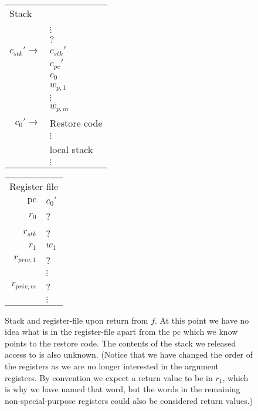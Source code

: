 \documentclass[a4paper]{article}
\newcommand{\var}[1]{\mathit{#1}}
\newcommand{\pc}{\mathit{pc}}
\newcommand{\pcreg}{\mathrm{pc}}
\begin{document}
\begin{figure}
  \label{fig:stack-upon-return}
  \centering
  \begin{tabular}[!h]{r | >{\raggedright\arraybackslash}p{3cm} |}
\multicolumn{2}{l}{Stack} \\
\cline{2-2}
   & \\
   & $\vdots$\\
\cline{2-2} 
   & $?$\\
\cline{2-2} 
$c_{\var{stk}}' \rightarrow$  & $c_{\var{stk}}'$ \\
\cline{2-2}
   & $c_\pc'$ \\
\cline{2-2}
   & $c_0$ \\
\cline{2-2}
   & $w_{p,1}$ \\
\cline{2-2}
   & $\vdots$ \\
\cline{2-2}
   & $w_{p,m}$ \\
\cline{2-2}
$c_0' \rightarrow$   & Restore code \\
   & $\vdots$\\
\cline{2-2}
   & local stack\\
   & $\vdots$\\
\cline{2-2}
\end{tabular}
\hspace{1cm}
\begin{tabular}{r | >{\centering\arraybackslash}p{0.75cm} |}
\multicolumn{2}{r}{Register file} \\
\cline{2-2}
$\pcreg$ & $c_0'$\\
\cline{2-2}
$r_0$  &  ? \\
\cline{2-2}
$r_{\var{stk}}$  & ? \\
\cline{2-2}
$r_1$ & $w_1$ \\
\cline{2-2}
$r_{\var{priv},1}$ & ?\\
\cline{2-2}
& $\vdots$ \\
\cline{2-2}
$r_{\var{priv},m}$ & ? \\
\cline{2-2}
& $\vdots$ \\
\cline{2-2}
\end{tabular}
\caption{ Stack and register-file upon return from $f$. At this point we have no idea what is in the register-file apart from the $\pcreg$ which we know points to the restore code. The contents of the stack we released access to is also unknown. (Notice that we have changed the order of the registers as we are no longer interested in the argument registers. By convention we expect a return value to be in $r_1$, which is why we have named that word, but the words in the remaining non-special-purpose registers could also be considered return values.)}
\end{figure}
\end{document}
